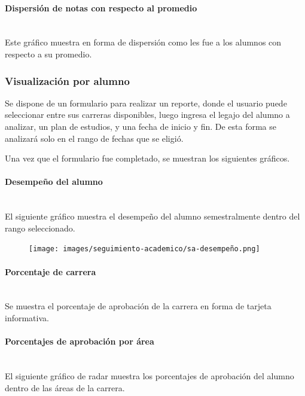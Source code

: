 \paragraph{Dispersión de notas con respecto al promedio} \mbox{}\\
Este gráfico muestra en forma de dispersión como les fue a los alumnos con respecto a su promedio.

\subsubsection{Visualización por alumno}
Se dispone de un formulario para realizar un reporte, donde el usuario puede seleccionar entre sus carreras disponibles, luego ingresa el legajo del alumno a analizar, un plan de estudios, y una fecha de inicio y fin. De esta forma se analizará solo en el rango de fechas que se eligió.

Una vez que el formulario fue completado, se muestran los siguientes gráficos.

\paragraph{Desempeño del alumno} \mbox{}\\
El siguiente gráfico muestra el desempeño del alumno semestralmente dentro del rango seleccionado.
\begin{figure}[!htbp]
  \centering
    \texttt{[image: images/seguimiento-academico/sa-desempeño.png]}
  \label{fig:sa-detalle-aprobacion}
\end{figure}

\paragraph{Porcentaje de carrera} \mbox{}\\
Se muestra el porcentaje de aprobación de la carrera en forma de tarjeta informativa.

\paragraph{Porcentajes de aprobación por área} \mbox{}\\
El siguiente gráfico de radar muestra los porcentajes de aprobación del alumno dentro de las áreas de la carrera.

